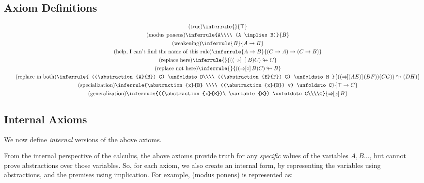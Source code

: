 \documentclass{article}
\begin{document}
  \newcommand{\here}{\true}

  \subsection{Axiom Definitions}
  \setlength{\jot}{1.4em}
  \begin{gather*}
    \tag{true}
    \inferrule{}{\true}\\
    \tag{modus ponens}
    \inferrule{A\\\\ (A \implies B)}{B}\\
    \tag{weakening}
    \inferrule{B}{A \implies B}\\
    \tag{help, I can't find the name of this rule}
    \inferrule{A \implies B}{(C \implies A)\implies(C \implies B)}\\
    \tag{replace here}
    \inferrule{}{((\abstraction{\here}{B}) C) \unfoldsto C}\\
    \tag{replace not here}
    \inferrule{}{((\abstraction{\hole}{B}) C) \unfoldsto B}\\
    \tag{replace in both}
    \inferrule{
      ((\abstraction{A}{B}) C) \unfoldsto D\\\\
      ((\abstraction{E}{F}) G) \unfoldsto H
    }{
      ((\abstraction{(AE)}{(BF)}) (CG)) \unfoldsto (DH)
    }\\
    \tag{specialization}
    \inferrule{\abstraction{x}{B} \\\\ ((\abstraction{x}{B}) v) \unfoldsto C}{\true \implies C}\\
    \tag{generalization}
    \inferrule{((\abstraction{x}{B})\ \variable{B}) \unfoldsto C\\\\C}{\abstraction{x}{B}}\\
  \end{gather*}

  \subsection{Internal Axioms}

  We now define \emph{internal} versions of the above axioms.
  
  From the internal perspective of the calculus, the above axioms provide truth for any \emph{specific} values of the variables $A, B\dots$, but cannot prove abstractions over those variables.
  So, for each axiom, we also create an internal form, by representing the variables using abstractions, and the premises using implication. For example, (modus ponens) is represented as:
\end{document}
